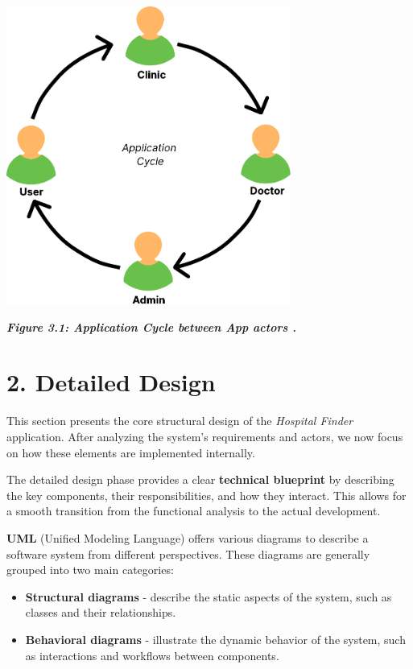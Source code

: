 \documentclass[12pt]{report}
\begin{document}
\vspace*{0.6cm}
\begin{center}
	\includegraphics[width=0.7\textwidth]{images/appcucle@2x.pdf}
\end{center}
\vspace{0.1cm}
\begin{center}
	\textit{\textbf{Figure 3.1: Application Cycle between App actors .}}
\end{center}
\vspace{0.5cm}

\section*{2. Detailed Design}

This section presents the core structural design of the \textit{Hospital Finder} application. After analyzing the system’s requirements and actors, we now focus on how these elements are implemented internally.

\noindent The detailed design phase provides a clear \textbf{technical blueprint} by describing the key components, their responsibilities, and how they interact. This allows for a smooth transition from the functional analysis to the actual development.

\noindent \textbf{UML} (Unified Modeling Language) offers various diagrams to describe a software system from different perspectives. These diagrams are generally grouped into two main categories:


\begin{itemize}
	\item \textbf{Structural diagrams} - describe the static aspects of the system, such as classes and their relationships.
	\item \textbf{Behavioral diagrams} - illustrate the dynamic behavior of the system, such as interactions and workflows between components.
\end{itemize}
\end{document}
